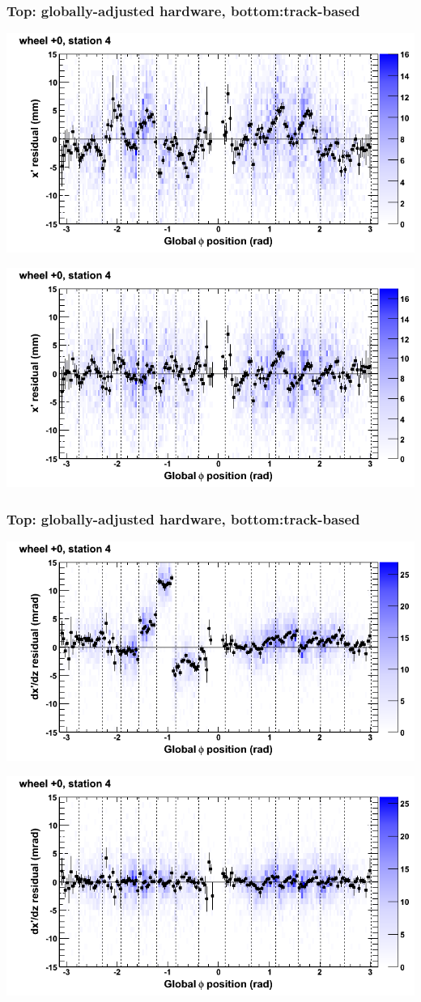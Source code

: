 \documentclass[compress]{beamer}
\begin{document}
\begin{frame}
\frametitle{Top: globally-adjusted hardware, bottom:track-based}
\includegraphics[width=0.7\linewidth]{NOV4_mapplots_HW/DTvsphi_st4whC_x.png}

\includegraphics[width=0.7\linewidth]{NOV4_mapplots/DTvsphi_st4whC_x.png}
\end{frame}

\begin{frame}
\frametitle{Top: globally-adjusted hardware, bottom:track-based}
\includegraphics[width=0.7\linewidth]{NOV4_mapplots_HW/DTvsphi_st4whC_dxdz.png}

\includegraphics[width=0.7\linewidth]{NOV4_mapplots/DTvsphi_st4whC_dxdz.png}
\end{frame}
\end{document}
